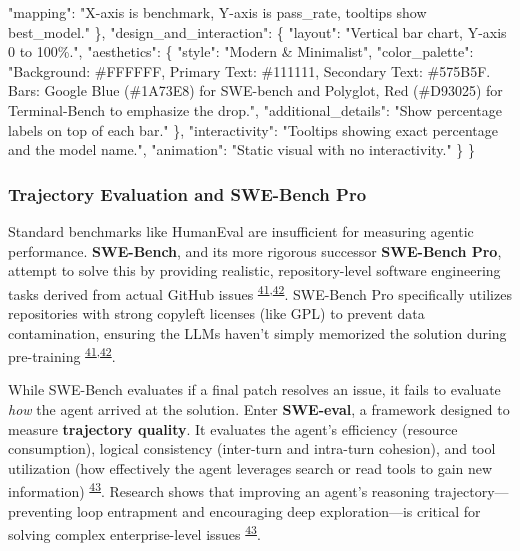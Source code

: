 \documentclass[
  11pt,
]{article}
\newenvironment{Shaded}{}{}
\newcommand{\DataTypeTok}[1]{\textcolor[rgb]{0.56,0.13,0.00}{#1}}
\newcommand{\FunctionTok}[1]{\textcolor[rgb]{0.02,0.16,0.49}{#1}}
\newcommand{\StringTok}[1]{\textcolor[rgb]{0.25,0.44,0.63}{#1}}
\begin{document}
\begin{Shaded}
\begin{Highlighting}[]
    \DataTypeTok{"mapping"}\FunctionTok{:} \StringTok{"X{-}axis is \textquotesingle{}benchmark\textquotesingle{}, Y{-}axis is \textquotesingle{}pass\_rate\textquotesingle{}, tooltips show \textquotesingle{}best\_model\textquotesingle{}."}
  \FunctionTok{\},}
  \DataTypeTok{"design\_and\_interaction"}\FunctionTok{:} \FunctionTok{\{}
    \DataTypeTok{"layout"}\FunctionTok{:} \StringTok{"Vertical bar chart, Y{-}axis 0 to 100\%."}\FunctionTok{,}
    \DataTypeTok{"aesthetics"}\FunctionTok{:} \FunctionTok{\{}
      \DataTypeTok{"style"}\FunctionTok{:} \StringTok{"Modern \& Minimalist"}\FunctionTok{,}
      \DataTypeTok{"color\_palette"}\FunctionTok{:} \StringTok{"Background: \#FFFFFF, Primary Text: \#111111, Secondary Text: \#575B5F. Bars: Google Blue (\#1A73E8) for SWE{-}bench and Polyglot, Red (\#D93025) for Terminal{-}Bench to emphasize the drop."}\FunctionTok{,}
      \DataTypeTok{"additional\_details"}\FunctionTok{:} \StringTok{"Show percentage labels on top of each bar."}
    \FunctionTok{\},}
    \DataTypeTok{"interactivity"}\FunctionTok{:} \StringTok{"Tooltips showing exact percentage and the model name."}\FunctionTok{,}
    \DataTypeTok{"animation"}\FunctionTok{:} \StringTok{"Static visual with no interactivity."}
  \FunctionTok{\}}
\FunctionTok{\}}
\end{Highlighting}
\end{Shaded}

\hypertarget{trajectory-evaluation-and-swe-bench-pro}{%
\subsubsection{Trajectory Evaluation and SWE-Bench
Pro}\label{trajectory-evaluation-and-swe-bench-pro}}

Standard benchmarks like HumanEval are insufficient for measuring
agentic performance. \textbf{SWE-Bench}, and its more rigorous successor
\textbf{SWE-Bench Pro}, attempt to solve this by providing realistic,
repository-level software engineering tasks derived from actual GitHub
issues
\textsuperscript{\protect\hyperlink{cite-41}{41},\protect\hyperlink{cite-42}{42}}.
SWE-Bench Pro specifically utilizes repositories with strong copyleft
licenses (like GPL) to prevent data contamination, ensuring the LLMs
haven't simply memorized the solution during pre-training
\textsuperscript{\protect\hyperlink{cite-41}{41},\protect\hyperlink{cite-42}{42}}.

While SWE-Bench evaluates if a final patch resolves an issue, it fails
to evaluate \emph{how} the agent arrived at the solution. Enter
\textbf{SWE-eval}, a framework designed to measure \textbf{trajectory
quality}. It evaluates the agent's efficiency (resource consumption),
logical consistency (inter-turn and intra-turn cohesion), and tool
utilization (how effectively the agent leverages search or read tools to
gain new information) \textsuperscript{\protect\hyperlink{cite-43}{43}}.
Research shows that improving an agent's reasoning
trajectory---preventing loop entrapment and encouraging deep
exploration---is critical for solving complex enterprise-level issues
\textsuperscript{\protect\hyperlink{cite-43}{43}}.
\end{document}
